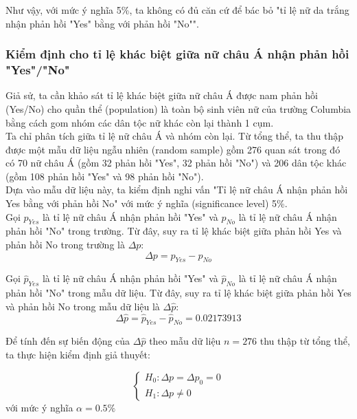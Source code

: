 \documentclass[a4paper,12pt]{article}
\begin{document}
		Như vậy, với mức ý nghĩa 5\%, ta không có đủ căn cứ để bác bỏ "tỉ lệ nữ da trắng nhận phản hồi "Yes" bằng với phản hồi "No"".
		
		\subsubsection{Kiểm định cho tỉ lệ khác biệt giữa nữ châu Á nhận phản hồi "Yes"/"No"}
		
			Giả sử, ta cần khảo sát tỉ lệ khác biệt giữa nữ châu Á được nam phản hồi (Yes/No) cho quần thể (population) là toàn bộ sinh viên nữ của trường Columbia bằng cách gom nhóm các dân tộc nữ khác còn lại thành 1 cụm.\\
			
			Ta chỉ phân tích giữa tỉ lệ nữ châu Á và nhóm còn lại. Từ tổng thể, ta thu thập được một mẫu dữ liệu ngẫu nhiên (random sample) gồm 276 quan sát trong đó có 70 nữ châu Á (gồm 32 phản hồi "Yes", 32 phản hồi "No") và 206 dân tộc khác (gồm 108 phản hồi "Yes" và 98 phản hồi "No").\\
			
			Dựa vào mẫu dữ liệu này, ta kiểm định nghi vấn "Tỉ lệ nữ châu Á nhận phản hồi Yes bằng với phản hồi No" với mức ý nghĩa (significance level) 5\%.\\
		
			Gọi $p_{Yes}$ là tỉ lệ nữ châu Á nhận phản hồi "Yes" và $p_{No}$ là tỉ lệ nữ châu Á nhận phản hồi "No" trong trường. Từ đây, suy ra tỉ lệ khác biệt giữa phản hồi Yes và phản hồi No trong trường là $\Delta p$: 
			$$\Delta p = p_{Yes} - p_{No}$$
			
			Gọi $\hat{p}_{Yes}$ là tỉ lệ nữ châu Á nhận phản hồi "Yes" và $\hat{p}_{No}$ là tỉ lệ nữ châu Á nhận phản hồi "No" trong mẫu dữ liệu. Từ đây, suy ra tỉ lệ khác biệt giữa phản hồi Yes và phản hồi No trong mẫu dữ liệu là $\Delta\hat{p}$:
			$$\Delta\hat{p} = \hat{p}_{Yes} - \hat{p}_{No} = 0.02173913$$
			
			Để tính đến sự biến động của $\Delta\hat{p}$ theo mẫu dữ liệu $n = 276$ thu thập từ tổng thể, ta thực hiện kiểm định giả thuyết:
			
			\begin{equation*}
			\begin{cases}
			H_0: \Delta p = \Delta p_0 = 0\\
			H_1: \Delta p \neq 0
			\end{cases}
			\end{equation*}
			với mức ý nghĩa $\alpha = 0.5\%$
			
\end{document}
